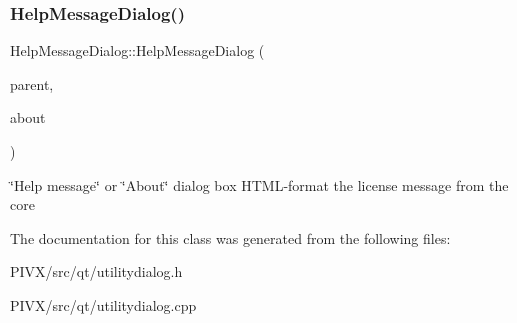 \subsubsection{\texorpdfstring{Help\+Message\+Dialog()}{HelpMessageDialog()}}
{\footnotesize\ttfamily Help\+Message\+Dialog\+::\+Help\+Message\+Dialog (\begin{DoxyParamCaption}\item[{Q\+Widget $\ast$}]{parent,  }\item[{bool}]{about }\end{DoxyParamCaption})\hspace{0.3cm}{\ttfamily [explicit]}}

\char`\"{}\+Help message\char`\"{} or \char`\"{}\+About\char`\"{} dialog box H\+T\+M\+L-\/format the license message from the core 

The documentation for this class was generated from the following files\+:\begin{DoxyCompactItemize}
\item 
P\+I\+V\+X/src/qt/utilitydialog.\+h\item 
P\+I\+V\+X/src/qt/utilitydialog.\+cpp\end{DoxyCompactItemize}
